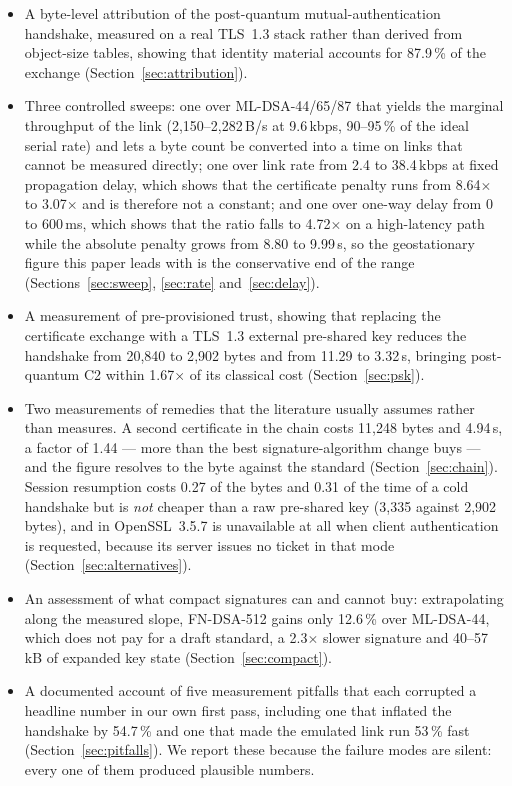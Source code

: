 \documentclass[drones,article,submit,pdftex,moreauthors]{Definitions/mdpi}
\newcommand{\kbps}{kbps}
\newcommand{\mldsa}{ML-DSA}
\newcommand{\fndsa}{FN-DSA}
\newcommand{\tls}{TLS}
\begin{document}
\begin{itemize}
\item A byte-level attribution of the post-quantum mutual-authentication
  handshake, measured on a real \tls{}~1.3 stack rather than derived
  from object-size tables, showing that identity material accounts for
  87.9\,\% of the exchange (Section~\ref{sec:attribution}).

\item Three controlled sweeps: one over \mldsa{}-44/65/87 that yields
  the marginal throughput of the link (2{,}150--2{,}282\,B/s at
  9.6\,\kbps{}, 90--95\,\% of the ideal serial rate) and lets a byte
  count be converted into a time on links that cannot be measured
  directly; one over link rate from 2.4 to 38.4\,\kbps{} at fixed
  propagation delay, which shows that the certificate penalty runs from
  8.64$\times$ to 3.07$\times$ and is therefore not a constant; and one
  over one-way delay from 0 to 600\,ms, which shows that the ratio falls
  to 4.72$\times$ on a high-latency path while the absolute penalty
  grows from 8.80 to 9.99\,s, so the geostationary figure this paper
  leads with is the conservative end of the range
  (Sections~\ref{sec:sweep}, \ref{sec:rate} and~\ref{sec:delay}).

\item A measurement of pre-provisioned trust, showing that replacing the
  certificate exchange with a \tls{}~1.3 external pre-shared key reduces
  the handshake from 20{,}840 to 2{,}902 bytes and from 11.29 to
  3.32\,s, bringing post-quantum C2 within 1.67$\times$ of its
  classical cost (Section~\ref{sec:psk}).

\item Two measurements of remedies that the literature usually assumes
  rather than measures. A second certificate in the chain costs
  11{,}248 bytes and 4.94\,s, a factor of 1.44 --- more than the best
  signature-algorithm change buys --- and the figure resolves to the byte
  against the standard (Section~\ref{sec:chain}). Session resumption
  costs 0.27 of the bytes and 0.31 of the time of a cold handshake but
  is \emph{not} cheaper than a raw pre-shared key (3{,}335 against
  2{,}902 bytes), and in OpenSSL~3.5.7 is unavailable at all when client
  authentication is requested, because its server issues no ticket in
  that mode (Section~\ref{sec:alternatives}).

\item An assessment of what compact signatures can and cannot buy:
  extrapolating along the measured slope, \fndsa{}-512 gains only
  12.6\,\% over \mldsa{}-44, which does not pay for a draft standard, a
  2.3$\times$ slower signature and 40--57\,kB of expanded key state
  (Section~\ref{sec:compact}).

\item A documented account of five measurement pitfalls that each
  corrupted a headline number in our own first pass, including one that
  inflated the handshake by 54.7\,\% and one that made the emulated link
  run 53\,\% fast (Section~\ref{sec:pitfalls}). We report
  these because the failure modes are silent: every one of them produced
  plausible numbers.
\end{itemize}
\end{document}
